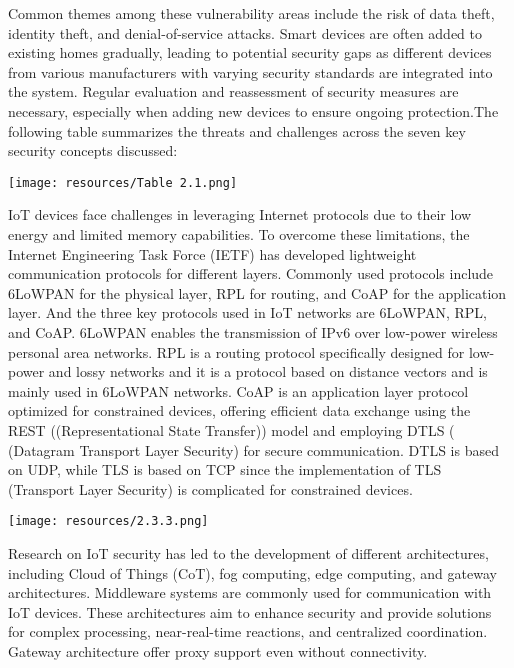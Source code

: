 Common themes among these vulnerability areas include the risk of data theft, identity theft, and denial-of-service attacks. Smart devices are often added to existing homes gradually, leading to potential security gaps as different devices from various manufacturers with varying security standards are integrated into the system. Regular evaluation and reassessment of security measures are necessary, especially when adding new devices to ensure ongoing protection.The following table summarizes the threats and challenges across the seven key security concepts discussed:

\texttt{[image: resources/Table 2.1.png]}

IoT devices face challenges in leveraging Internet protocols due to their low energy and limited memory capabilities. To overcome these limitations, the Internet Engineering Task Force (IETF) has developed lightweight communication protocols for different layers. Commonly used protocols include 6LoWPAN for the physical layer, RPL for routing, and CoAP for the application layer. And the three key protocols used in IoT networks are 6LoWPAN, RPL, and CoAP. 6LoWPAN enables the transmission of IPv6 over low-power wireless personal area networks. RPL is a routing protocol specifically designed for low-power and lossy networks and it is a protocol based on distance vectors and is mainly used in 6LoWPAN networks. CoAP is an application layer protocol optimized for constrained devices, offering efficient data exchange using the REST ((Representational State Transfer)) model and employing DTLS ( (Datagram Transport Layer Security) for secure communication. DTLS is based on UDP, while TLS is based on TCP since the implementation of TLS (Transport Layer Security) is complicated for constrained devices.

\texttt{[image: resources/2.3.3.png]}

Research on IoT security has led to the development of different architectures, including Cloud of Things (CoT), fog computing, edge computing, and gateway architectures. Middleware systems are commonly used for communication with IoT devices. These architectures aim to enhance security and provide solutions for complex processing, near-real-time reactions, and centralized coordination. Gateway architecture offer proxy support even without connectivity.


